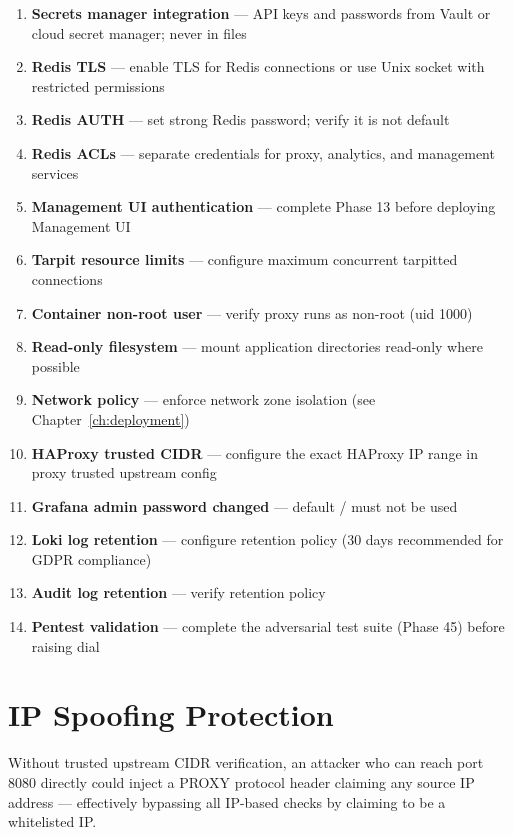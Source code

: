 \begin{enumerate}
  \item[\(\square\)] \textbf{Secrets manager integration} — API keys and passwords from Vault or cloud secret manager; never in  files
  \item[\(\square\)] \textbf{Redis TLS} — enable TLS for Redis connections or use Unix socket with restricted permissions
  \item[\(\square\)] \textbf{Redis AUTH} — set strong Redis password; verify it is not default
  \item[\(\square\)] \textbf{Redis ACLs} — separate credentials for proxy, analytics, and management services
  \item[\(\square\)] \textbf{Management UI authentication} — complete Phase 13 before deploying Management UI
  \item[\(\square\)] \textbf{Tarpit resource limits} — configure maximum concurrent tarpitted connections
  \item[\(\square\)] \textbf{Container non-root user} — verify proxy runs as non-root (uid 1000)
  \item[\(\square\)] \textbf{Read-only filesystem} — mount application directories read-only where possible
  \item[\(\square\)] \textbf{Network policy} — enforce network zone isolation (see Chapter~\ref{ch:deployment})
  \item[\(\square\)] \textbf{HAProxy trusted CIDR} — configure the exact HAProxy IP range in proxy trusted upstream config
  \item[\(\square\)] \textbf{Grafana admin password changed} — default / must not be used
  \item[\(\square\)] \textbf{Loki log retention} — configure retention policy (30 days recommended for GDPR compliance)
  \item[\(\square\)] \textbf{Audit log retention} — verify  retention policy
  \item[\(\square\)] \textbf{Pentest validation} — complete the adversarial test suite (Phase 45) before raising dial
\end{enumerate}

\section{IP Spoofing Protection}

Without trusted upstream CIDR verification, an attacker who can reach port 8080
directly could inject a PROXY protocol header claiming any source IP address —
effectively bypassing all IP-based checks by claiming to be a whitelisted IP.

